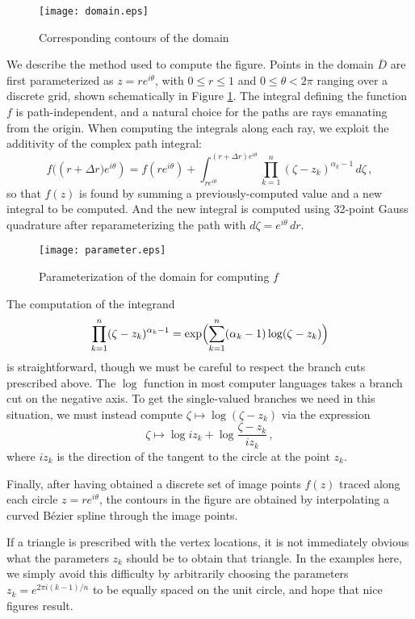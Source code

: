 \documentclass[12pt]{article}
\begin{document}
\begin{figure}
\begin{center}
\texttt{[image: domain.eps]}
\end{center}
\caption{Corresponding contours of the domain}
\end{figure}

We describe the method used to compute the figure.
Points in the domain $\overline{D}$ are first parameterized 
as $z = re^{i\theta}$,
with $0 \leq r \leq 1$ and $0 \leq \theta < 2\pi$
ranging over a discrete grid, shown schematically in Figure \ref{fig:circle}.
The integral defining the function $f$ is path-independent,
and a natural choice for the paths are
rays emanating from the origin.
When computing the integrals along each ray,
we exploit the additivity of the complex path integral:
\[
f\bigl((r + \Delta r\bigr) e^{i\theta}) = f(re^{i\theta}) 
+ \int_{re^{i\theta}}^{(r+\Delta r) e^{i\theta}} \prod_{k=1}^n (\zeta - z_k)^{\alpha_k - 1} \, d\zeta\,,
\]
so that $f(z)$ is found by summing a previously-computed value
and a new integral to be computed.  And the new integral
is computed using 32-point Gauss quadrature
after reparameterizing the path with $d\zeta = e^{i\theta} \, dr$.

\begin{figure}
\begin{center}
\texttt{[image: parameter.eps]}
\end{center}
\caption{Parameterization of the domain for computing $f$}
\label{fig:circle}
\end{figure}


The computation of the integrand
\[
\prod_{k=1}^n (\zeta - z_k)^{\alpha_k - 1} = \exp\Bigl( \sum_{k=1}^n (\alpha_k - 1) \log ( \zeta - z_k) \Bigr)
\]
 is straightforward, though 
we must be careful to respect the branch cuts prescribed above.
The $\log$ function in most computer languages
takes a branch cut on the negative axis.
To get the single-valued branches we need in this situation,
we must instead compute $\zeta \mapsto \log ( \zeta - z_k)$ via the expression
\[
\zeta \mapsto \log iz_k + \log \frac{\zeta - z_k}{i z_k}\,,
\]
where $iz_k$ is the direction of the tangent to the circle at the point $z_k$.

Finally, after having obtained a discrete set of image points $f(z)$
traced along each circle $z = re^{i \theta}$,
the contours in the figure are obtained by interpolating a 
curved B\'ezier spline 
through the image points.

If a triangle is prescribed with the vertex locations, 
it is not immediately obvious what the parameters $z_k$ should be to obtain
that triangle.  In the examples here, we simply avoid this difficulty
by arbitrarily choosing the parameters $z_k = e^{2\pi i (k-1)/n}$ 
to be equally spaced on the unit circle, and hope that nice figures result.
\end{document}
